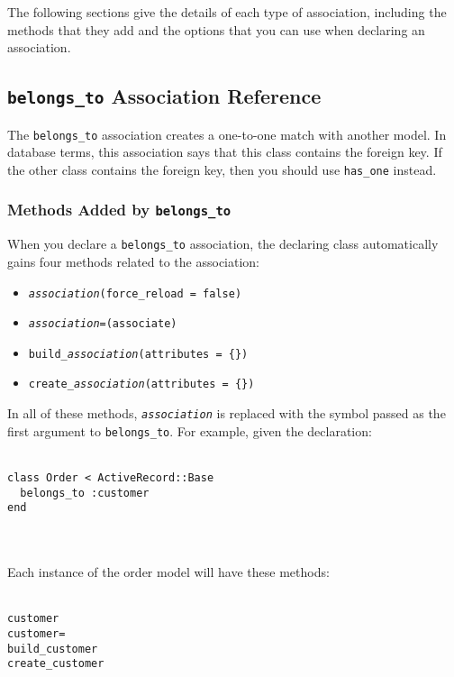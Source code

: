 \documentclass[10pt]{book}
\begin{document}
The following sections give the details of each type of association,  including the methods that they add and the options that you can use  when declaring an association.

\subsection{ \texttt{belongs\_to} Association Reference}

The \texttt{belongs\_to} association creates a one-to-one match with  another model. In database terms, this association says that this class  contains the foreign key. If the other class contains the foreign key,  then you should use \texttt{has\_one} instead.

\subsubsection{ Methods Added by \texttt{belongs\_to}}

When you declare a \texttt{belongs\_to} association, the declaring class automatically gains four methods related to the association:
\begin{itemize}
	\item \texttt{\emph{association}(force\_reload = false)}
	\item \texttt{\emph{association}=(associate)}
	\item \texttt{build\_\emph{association}(attributes = \{\})}
	\item \texttt{create\_\emph{association}(attributes = \{\})}
\end{itemize}

In all of these methods, \texttt{\emph{association}} is replaced with the symbol passed as the first argument to \texttt{belongs\_to}. For example, given the declaration:
\\ \\
\begin{minipage}{\textwidth}{\scriptsize
\begin{verbatim}
class Order < ActiveRecord::Base
  belongs_to :customer
end
\end{verbatim}}
\end{minipage}
\\ \\

Each instance of the order model will have these methods:
\\ \\
\begin{minipage}{\textwidth}{\scriptsize
\begin{verbatim}
customer
customer=
build_customer
create_customer
\end{verbatim}}
\end{minipage}
\\ \\
\end{document}
